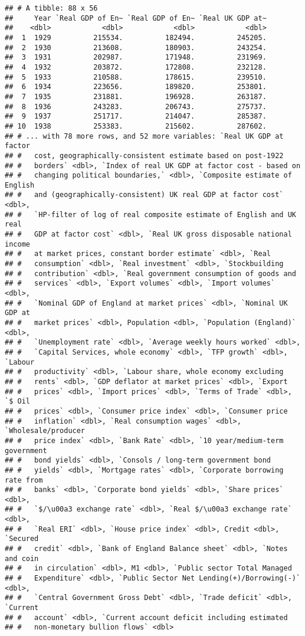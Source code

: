 \documentclass[]{article}
\begin{document}
\begin{verbatim}
## # A tibble: 88 x 56
##     Year `Real GDP of En~ `Real GDP of En~ `Real UK GDP at~
##    <dbl>            <dbl>            <dbl>            <dbl>
##  1  1929          215534.          182494.          245205.
##  2  1930          213608.          180903.          243254.
##  3  1931          202987.          171948.          231969.
##  4  1932          203872.          172808.          232128.
##  5  1933          210588.          178615.          239510.
##  6  1934          223656.          189820.          253801.
##  7  1935          231881.          196928.          263187.
##  8  1936          243283.          206743.          275737.
##  9  1937          251717.          214047.          285387.
## 10  1938          253383.          215602.          287602.
## # ... with 78 more rows, and 52 more variables: `Real UK GDP at factor
## #   cost, geographically-consistent estimate based on post-1922
## #   borders` <dbl>, `Index of real UK GDP at factor cost - based on
## #   changing political boundaries,` <dbl>, `Composite estimate of English
## #   and (geographically-consistent) UK real GDP at factor cost` <dbl>,
## #   `HP-filter of log of real composite estimate of English and UK real
## #   GDP at factor cost` <dbl>, `Real UK gross disposable national income
## #   at market prices, constant border estimate` <dbl>, `Real
## #   consumption` <dbl>, `Real investment` <dbl>, `Stockbuilding
## #   contribution` <dbl>, `Real government consumption of goods and
## #   services` <dbl>, `Export volumes` <dbl>, `Import volumes` <dbl>,
## #   `Nominal GDP of England at market prices` <dbl>, `Nominal UK GDP at
## #   market prices` <dbl>, Population <dbl>, `Population (England)` <dbl>,
## #   `Unemployment rate` <dbl>, `Average weekly hours worked` <dbl>,
## #   `Capital Services, whole economy` <dbl>, `TFP growth` <dbl>, `Labour
## #   productivity` <dbl>, `Labour share, whole economy excluding
## #   rents` <dbl>, `GDP deflator at market prices` <dbl>, `Export
## #   prices` <dbl>, `Import prices` <dbl>, `Terms of Trade` <dbl>, `$ Oil
## #   prices` <dbl>, `Consumer price index` <dbl>, `Consumer price
## #   inflation` <dbl>, `Real consumption wages` <dbl>, `Wholesale/producer
## #   price index` <dbl>, `Bank Rate` <dbl>, `10 year/medium-term government
## #   bond yields` <dbl>, `Consols / long-term government bond
## #   yields` <dbl>, `Mortgage rates` <dbl>, `Corporate borrowing rate from
## #   banks` <dbl>, `Corporate bond yields` <dbl>, `Share prices` <dbl>,
## #   `$/\u00a3 exchange rate` <dbl>, `Real $/\u00a3 exchange rate` <dbl>,
## #   `Real ERI` <dbl>, `House price index` <dbl>, Credit <dbl>, `Secured
## #   credit` <dbl>, `Bank of England Balance sheet` <dbl>, `Notes and coin
## #   in circulation` <dbl>, M1 <dbl>, `Public sector Total Managed
## #   Expenditure` <dbl>, `Public Sector Net Lending(+)/Borrowing(-)` <dbl>,
## #   `Central Government Gross Debt` <dbl>, `Trade deficit` <dbl>, `Current
## #   account` <dbl>, `Current account deficit including estimated
## #   non-monetary bullion flows` <dbl>
\end{verbatim}
\end{document}
